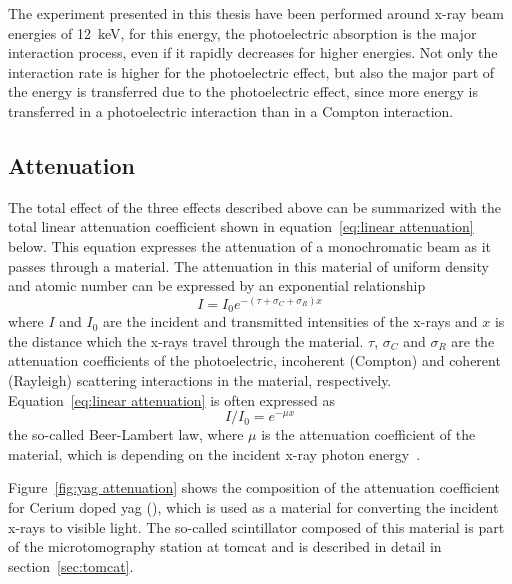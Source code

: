 The experiment presented in this thesis have been performed around x-ray beam energies of \SI{12}{\kilo\electronvolt}, for this energy, the photoelectric absorption is the major interaction process, even if it rapidly decreases for higher energies. Not only the interaction rate is higher for the photoelectric effect, but also the major part of the energy is transferred due to the photoelectric effect, since more energy is transferred in a photoelectric interaction than in a Compton interaction.

\subsection{Attenuation}
The total effect of the three effects described above can be summarized with the total linear attenuation coefficient shown in equation~\ref{eq:linear attenuation} below. This equation expresses the attenuation of a monochromatic beam as it passes through a material. The attenuation in this material of uniform density and atomic number can be expressed by an exponential relationship%
\begin{equation}%
	I=I_{0}e^{-(\tau+\sigma_{C}+\sigma_{R})x}%
	\label{eq:linear attenuation}%
\end{equation}%
where $I$ and $I_{0}$ are the incident and transmitted intensities of the x-rays and $x$ is the distance which the x-rays travel through the material. $\tau$, $\sigma_{C}$ and $\sigma_{R}$ are the attenuation coefficients of the photoelectric, incoherent (Compton) and coherent (Rayleigh) scattering interactions in the material, respectively. Equation~\ref{eq:linear attenuation} is often expressed as
\begin{equation}
	I/I_{0}=e^{-\mu x}
	\label{eq:beer-lambert}
\end{equation}%
the so-called Beer-Lambert law, where $\mu$ is the attenuation coefficient of the material, which is depending on the incident x-ray photon energy~\cite{Hsieh2003}. 

Figure~\ref{fig:yag attenuation} shows the composition of the attenuation coefficient for Cerium doped \ac{yag} (), which is used as a material for converting the incident x-rays to visible light. The so-called scintillator composed of this material is part of the microtomography station at \ac{tomcat} and is described in detail in section~\ref{sec:tomcat}.

